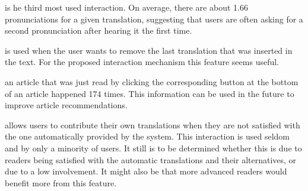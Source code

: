  is he third most used interaction. On average, there are about 1.66 pronunciations for a given translation, suggesting that users are often asking for a second pronunciation after hearing it the first time. 




 is used when the user wants to remove the last translation that was inserted in the text. For the proposed interaction mechanism this feature seems useful. 

 an article that was just read by clicking the corresponding button at the bottom of an article happened 174 times. This information can be used in the future to improve article recommendations.

 allows users to contribute their own translations when they are not satisfied with the one automatically provided by the system. This interaction is used seldom and by only a minority of users. It still is to be determined whether this is due to readers being satisfied with the automatic translations and their alternatives, or due to a low involvement. It might also be that more advanced readers would benefit more from this feature.



